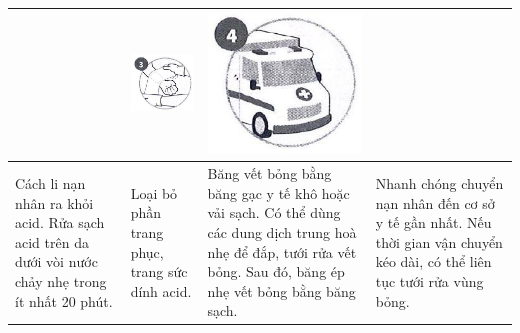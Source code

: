 \documentclass[10pt]{article}
\begin{document}
\begin{center}
\begin{tabular}{|l|l|l|l|}
 & \includegraphics[max width=\textwidth]{2025_10_23_adad5b98d65ac6665838g-10(2)}
 & \includegraphics[max width=\textwidth]{2025_10_23_adad5b98d65ac6665838g-10}
 \\
\hline
Cách li nạn nhân ra khỏi acid. Rửa sạch acid trên da dưới vòi nước chảy nhẹ trong ít nhất 20 phút. & Loại bỏ phần trang phục, trang sức dính acid. & Băng vết bỏng bằng băng gạc y tế khô hoặc vải sạch. Có thể dùng các dung dịch trung hoà nhẹ để đắp, tưới rửa vết bỏng. Sau đó, băng ép nhẹ vết bỏng bằng băng sạch. & Nhanh chóng chuyển nạn nhân đến cơ sở y tế gần nhất. Nếu thời gian vận chuyển kéo dài, có thể liên tục tưới rửa vùng bỏng. \\
\hline
\end{tabular}
\end{center}
\end{document}
